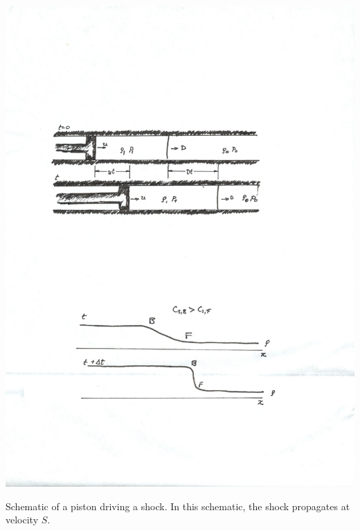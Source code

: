\begin{marginfigure}
\includegraphics[width=\textwidth]{piston}
\caption[Schematic of a piston driving a shock.]{Schematic of a piston driving a shock.  In this schematic, the shock propagates at velocity $S$.}
\label{f.piston}
\end{marginfigure}

